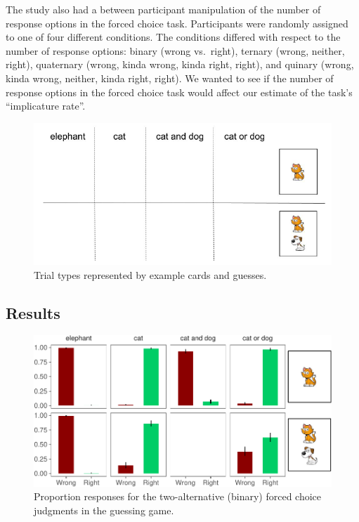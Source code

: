 \documentclass[floatsintext,man]{apa6}
\theoremstyle{definition}
\theoremstyle{definition}
\theoremstyle{definition}
\theoremstyle{remark}
\begin{document}
The study also had a between participant manipulation of the number of
response options in the forced choice task. Participants were randomly
assigned to one of four different conditions. The conditions differed
with respect to the number of response options: binary (wrong
vs.~right), ternary (wrong, neither, right), quaternary (wrong, kinda
wrong, kinda right, right), and quinary (wrong, kinda wrong, neither,
kinda right, right). We wanted to see if the number of response options
in the forced choice task would affect our estimate of the task's
\enquote{implicature rate}.

\begin{figure}
\centering
\includegraphics{writeup_files/figure-latex/trials-1.pdf}
\caption{\label{fig:trials}Trial types represented by example cards and
guesses.}
\end{figure}

\subsection{Results}\label{results}

\begin{figure}
\centering
\includegraphics{writeup_files/figure-latex/binaryPlot-1.pdf}
\caption{\label{fig:binaryPlot}Proportion responses for the two-alternative
(binary) forced choice judgments in the guessing game.}
\end{figure}
\end{document}
